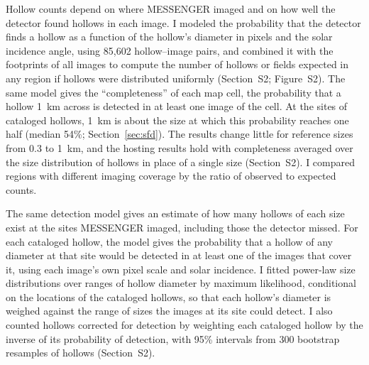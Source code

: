 \documentclass[article,review]{planetary}
\begin{document}
Hollow counts depend on where MESSENGER imaged and on how well the detector found hollows in each image. I modeled the probability that the detector finds a hollow as a function of the hollow's diameter in pixels and the solar incidence angle, using 85,602 hollow--image pairs, and combined it with the footprints of all images to compute the number of hollows or fields expected in any region if hollows were distributed uniformly (Section~S2; Figure~S2). The same model gives the ``completeness'' of each map cell, the probability that a hollow 1~km across is detected in at least one image of the cell. At the sites of cataloged hollows, 1~km is about the size at which this probability reaches one half (median 54\%; Section~\ref{sec:sfd}). The results change little for reference sizes from 0.3 to 1~km, and the hosting results hold with completeness averaged over the size distribution of hollows in place of a single size (Section~S2). I compared regions with different imaging coverage by the ratio of observed to expected counts.

The same detection model gives an estimate of how many hollows of each size exist at the sites MESSENGER imaged, including those the detector missed. For each cataloged hollow, the model gives the probability that a hollow of any diameter at that site would be detected in at least one of the images that cover it, using each image's own pixel scale and solar incidence. I fitted power-law size distributions over ranges of hollow diameter by maximum likelihood, conditional on the locations of the cataloged hollows, so that each hollow's diameter is weighed against the range of sizes the images at its site could detect. I also counted hollows corrected for detection by weighting each cataloged hollow by the inverse of its probability of detection, with 95\% intervals from 300 bootstrap resamples of hollows (Section~S2).
\end{document}
